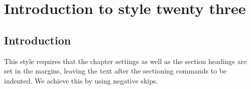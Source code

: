 \chapter{Introduction to style twenty three}

\section{Introduction}

This style requires that the chapter settings as well as the
section headings are set in the margins, leaving the text after the sectioning commands to be indented. We achieve this by using negative skips.
\medskip
\begin{figure}[ht]
\centering
{}
\end{figure}

